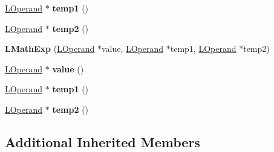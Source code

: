 \begin{DoxyCompactItemize}
\item 
\hyperlink{classv8_1_1internal_1_1_l_operand}{L\+Operand} $\ast$ {\bfseries temp1} ()\hypertarget{classv8_1_1internal_1_1_l_math_exp_a430c8c030cbaad33b264a77b03e0db75}{}\label{classv8_1_1internal_1_1_l_math_exp_a430c8c030cbaad33b264a77b03e0db75}

\item 
\hyperlink{classv8_1_1internal_1_1_l_operand}{L\+Operand} $\ast$ {\bfseries temp2} ()\hypertarget{classv8_1_1internal_1_1_l_math_exp_adb7bff0a3a668396d3393908dab289df}{}\label{classv8_1_1internal_1_1_l_math_exp_adb7bff0a3a668396d3393908dab289df}

\item 
{\bfseries L\+Math\+Exp} (\hyperlink{classv8_1_1internal_1_1_l_operand}{L\+Operand} $\ast$value, \hyperlink{classv8_1_1internal_1_1_l_operand}{L\+Operand} $\ast$temp1, \hyperlink{classv8_1_1internal_1_1_l_operand}{L\+Operand} $\ast$temp2)\hypertarget{classv8_1_1internal_1_1_l_math_exp_a32a00730bc7d316fb3699ba289720b97}{}\label{classv8_1_1internal_1_1_l_math_exp_a32a00730bc7d316fb3699ba289720b97}

\item 
\hyperlink{classv8_1_1internal_1_1_l_operand}{L\+Operand} $\ast$ {\bfseries value} ()\hypertarget{classv8_1_1internal_1_1_l_math_exp_a59d6185f1b9e035a269046376b4432b8}{}\label{classv8_1_1internal_1_1_l_math_exp_a59d6185f1b9e035a269046376b4432b8}

\item 
\hyperlink{classv8_1_1internal_1_1_l_operand}{L\+Operand} $\ast$ {\bfseries temp1} ()\hypertarget{classv8_1_1internal_1_1_l_math_exp_a430c8c030cbaad33b264a77b03e0db75}{}\label{classv8_1_1internal_1_1_l_math_exp_a430c8c030cbaad33b264a77b03e0db75}

\item 
\hyperlink{classv8_1_1internal_1_1_l_operand}{L\+Operand} $\ast$ {\bfseries temp2} ()\hypertarget{classv8_1_1internal_1_1_l_math_exp_adb7bff0a3a668396d3393908dab289df}{}\label{classv8_1_1internal_1_1_l_math_exp_adb7bff0a3a668396d3393908dab289df}

\end{DoxyCompactItemize}
\subsection*{Additional Inherited Members}


